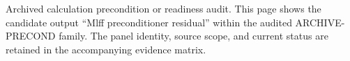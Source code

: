 Archived calculation precondition or readiness audit. This page shows the candidate output ``Mlff preconditioner residual'' within the audited ARCHIVE-PRECOND family. The panel identity, source scope, and current status are retained in the accompanying evidence matrix.
